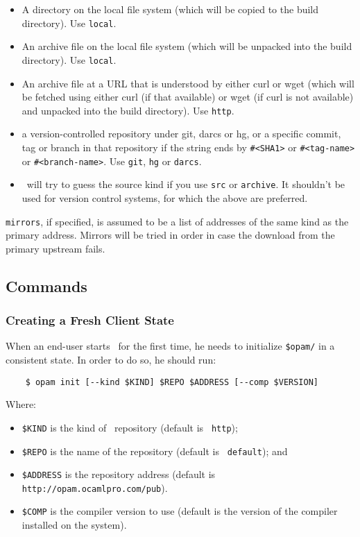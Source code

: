 \documentclass[a4paper,10pt]{article}
\begin{document}
\begin{itemize}
\item A directory on the local file system (which will be copied to
  the build directory). Use {\tt local}.
\item An archive file on the local file system (which will be unpacked
  into the build directory). Use {\tt local}.
\item An archive file at a URL that is understood by either curl or
  wget (which will be fetched using either curl (if that available) or
  wget (if curl is not available) and unpacked into the build
  directory). Use {\tt http}.
\item a version-controlled repository under git, darcs or
  hg, or a specific commit, tag or branch in that repository if
  the string ends by \verb+#<SHA1>+ or \verb+#<tag-name>+ or
  \verb+#<branch-name>+. Use {\tt git}, {\tt hg} or {\tt darcs}.
\item \OPAM\ will try to guess the source kind if you use {\tt src} or
  {\tt archive}. It shouldn't be used for version control systems, for
  which the above are preferred.
\end{itemize}

{\tt mirrors}, if specified, is assumed to be a list of addresses of the same
kind as the primary address. Mirrors will be tried in order in case the download
from the primary upstream fails.

\subsection{Commands}

\subsubsection{Creating a Fresh Client State}
\label{opam-init}

When an end-user starts \OPAM\ for the first time, he needs to
initialize \verb+$opam/+ in a consistent state. In order to do so, he
should run:

\begin{verbatim}
    $ opam init [--kind $KIND] $REPO $ADDRESS [--comp $VERSION]
\end{verbatim}

Where:
\begin{itemize}
\item \verb+$KIND+ is the kind of \OPAM\ repository (default is {\tt
  http});
\item \verb+$REPO+ is the name of the repository (default is {\tt
  default}); and
\item \verb+$ADDRESS+ is the repository address (default is
  \verb+http://opam.ocamlpro.com/pub+).
\item \verb+$COMP+ is the compiler version to use (default is the
  version of the compiler installed on the system).
\end{itemize}
\end{document}
